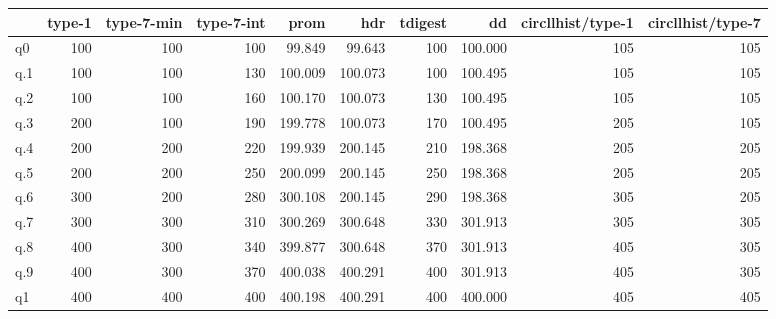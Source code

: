 \begin{tabular}{lrrrrrrrrr}
\toprule
{} &  type-1 &  type-7-min &  type-7-int &    prom &     hdr &  tdigest &      dd &  circllhist/type-1 &  circllhist/type-7 \\
\midrule
q0  &     100 &         100 &     100 &  99.849 &  99.643 &  100 & 100.000 &            105 &            105 \\
q.1 &     100 &         100 &     130 & 100.009 & 100.073 &  100 & 100.495 &            105 &            105 \\
q.2 &     100 &         100 &     160 & 100.170 & 100.073 &  130 & 100.495 &            105 &            105 \\
q.3 &     200 &         100 &     190 & 199.778 & 100.073 &  170 & 100.495 &            205 &            105 \\
q.4 &     200 &         200 &     220 & 199.939 & 200.145 &  210 & 198.368 &            205 &            205 \\
q.5 &     200 &         200 &     250 & 200.099 & 200.145 &  250 & 198.368 &            205 &            205 \\
q.6 &     300 &         200 &     280 & 300.108 & 200.145 &  290 & 198.368 &            305 &            205 \\
q.7 &     300 &         300 &     310 & 300.269 & 300.648 &  330 & 301.913 &            305 &            305 \\
q.8 &     400 &         300 &     340 & 399.877 & 300.648 &  370 & 301.913 &            405 &            305 \\
q.9 &     400 &         300 &     370 & 400.038 & 400.291 &  400 & 301.913 &            405 &            305 \\
q1  &     400 &         400 &     400 & 400.198 & 400.291 &  400 & 400.000 &            405 &            405 \\
\bottomrule
\end{tabular}
